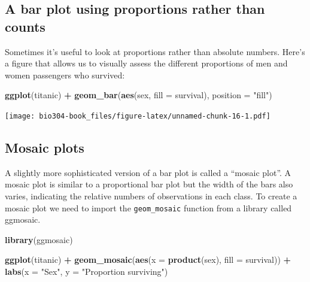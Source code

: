\documentclass[]{book}
\newenvironment{Shaded}{\begin{snugshade}}{\end{snugshade}}
\newcommand{\DataTypeTok}[1]{\textcolor[rgb]{0.13,0.29,0.53}{#1}}
\newcommand{\KeywordTok}[1]{\textcolor[rgb]{0.13,0.29,0.53}{\textbf{#1}}}
\newcommand{\NormalTok}[1]{#1}
\newcommand{\OperatorTok}[1]{\textcolor[rgb]{0.81,0.36,0.00}{\textbf{#1}}}
\newcommand{\StringTok}[1]{\textcolor[rgb]{0.31,0.60,0.02}{#1}}
\theoremstyle{definition}
\theoremstyle{definition}
\theoremstyle{definition}
\theoremstyle{remark}
\begin{document}
\hypertarget{a-bar-plot-using-proportions-rather-than-counts}{%
\subsection{A bar plot using proportions rather than
counts}\label{a-bar-plot-using-proportions-rather-than-counts}}

Sometimes it's useful to look at proportions rather than absolute
numbers. Here's a figure that allows us to visually assess the different
proportions of men and women passengers who survived:

\begin{Shaded}
\begin{Highlighting}[]
\KeywordTok{ggplot}\NormalTok{(titanic) }\OperatorTok{+}
\StringTok{  }\KeywordTok{geom_bar}\NormalTok{(}\KeywordTok{aes}\NormalTok{(sex, }\DataTypeTok{fill =}\NormalTok{ survival), }\DataTypeTok{position =} \StringTok{"fill"}\NormalTok{)}
\end{Highlighting}
\end{Shaded}

\texttt{[image: bio304-book\_files/figure-latex/unnamed-chunk-16-1.pdf]}

\hypertarget{mosaic-plots}{%
\subsection{Mosaic plots}\label{mosaic-plots}}

A slightly more sophisticated version of a bar plot is called a ``mosaic
plot''. A mosaic plot is similar to a proportional bar plot but the
width of the bars also varies, indicating the relative numbers of
observations in each class. To create a mosaic plot we need to import
the \texttt{geom\_mosaic} function from a library called ggmosaic.

\begin{Shaded}
\begin{Highlighting}[]
\KeywordTok{library}\NormalTok{(ggmosaic)}

\KeywordTok{ggplot}\NormalTok{(titanic) }\OperatorTok{+}\StringTok{ }
\StringTok{  }\KeywordTok{geom_mosaic}\NormalTok{(}\KeywordTok{aes}\NormalTok{(}\DataTypeTok{x =} \KeywordTok{product}\NormalTok{(sex), }\DataTypeTok{fill =}\NormalTok{ survival)) }\OperatorTok{+}\StringTok{ }
\StringTok{  }\KeywordTok{labs}\NormalTok{(}\DataTypeTok{x =} \StringTok{"Sex"}\NormalTok{, }\DataTypeTok{y =} \StringTok{"Proportion surviving"}\NormalTok{)}
\end{Highlighting}
\end{Shaded}
\end{document}

